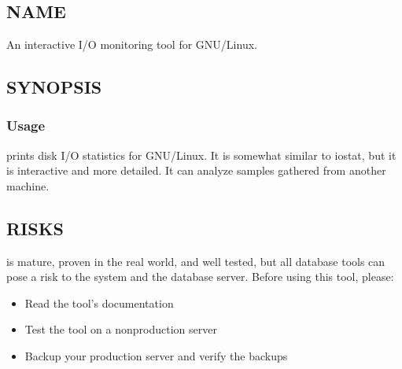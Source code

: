 \documentclass[letterpaper,10pt,english]{sphinxmanual}
\begin{document}
\chapter{}
\label{\detokenize{mariadb-iostat:mariadb-iostat}}\label{\detokenize{mariadb-iostat::doc}}

\section{NAME}
\label{\detokenize{mariadb-iostat:name}}
 \sphinxhyphen{} An interactive I/O monitoring tool for GNU/Linux.


\section{SYNOPSIS}
\label{\detokenize{mariadb-iostat:synopsis}}

\subsection{Usage}
\label{\detokenize{mariadb-iostat:usage}}
\begin{sphinxVerbatim}[commandchars=\\\{\}]
 \PYG{p}{[}\PYG{p}{]} \PYG{p}{[}\PYG{p}{]}
\end{sphinxVerbatim}

 prints disk I/O statistics for GNU/Linux.  It is somewhat similar
to iostat, but it is interactive and more detailed.  It can analyze samples
gathered from another machine.


\section{RISKS}
\label{\detokenize{mariadb-iostat:risks}}
 is mature, proven in the real world, and well tested,
but all database tools can pose a risk to the system and the database
server.  Before using this tool, please:
\begin{itemize}
\item {} 
Read the tool’s documentation

\item {} 
Test the tool on a non\sphinxhyphen{}production server

\item {} 
Backup your production server and verify the backups

\end{itemize}
\end{document}
